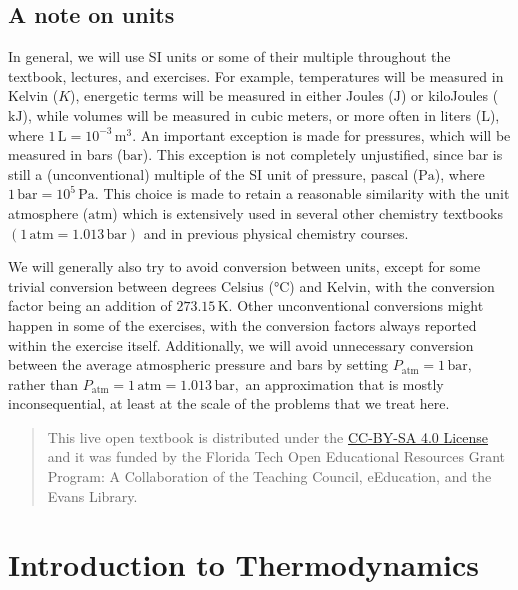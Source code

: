 \documentclass[
  9pt,
]{extbook}
\let\origdoublepage\cleardoublepage
\newcommand{\clearemptydoublepage}{%
  \clearpage
  {\pagestyle{empty}\origdoublepage}%
}
\let\cleardoublepage\clearemptydoublepage
\theoremstyle{definition}
\theoremstyle{definition}
\theoremstyle{definition}
\theoremstyle{remark}
\begin{document}
\hypertarget{a-note-on-units}{%
\section*{A note on units}\label{a-note-on-units}}

In general, we will use SI units or some of their multiple throughout the textbook, lectures, and exercises. For example, temperatures will be measured in Kelvin (\(K\)), energetic terms will be measured in either Joules (\(\text{J}\)) or kiloJoules (\(\text{kJ}\)), while volumes will be measured in cubic meters, or more often in liters (\(\text{L}\)), where \(1\,\text{L} = 10^{-3}\,\text{m}^3\). An important exception is made for pressures, which will be measured in bars (\(\text{bar}\)). This exception is not completely unjustified, since bar is still a (unconventional) multiple of the SI unit of pressure, pascal (\(\text{Pa}\)), where \(1\,\text{bar} = 10^5\,\text{Pa}\). This choice is made to retain a reasonable similarity with the unit atmosphere (\(\text{atm}\)) which is extensively used in several other chemistry textbooks \((1\,\text{atm} = 1.013\,\text{bar})\) and in previous physical chemistry courses.

We will generally also try to avoid conversion between units, except for some trivial conversion between degrees Celsius (°C) and Kelvin, with the conversion factor being an addition of \(273.15\,\text{K}\). Other unconventional conversions might happen in some of the exercises, with the conversion factors always reported within the exercise itself.
Additionally, we will avoid unnecessary conversion between the average atmospheric pressure and bars by setting \(P_{\text{atm}} = 1\,\text{bar},\) rather than \(P_{\text{atm}} = 1\,\text{atm} = 1.013\, \text{bar},\) an approximation that is mostly inconsequential, at least at the scale of the problems that we treat here.

\begin{quote}
This live open textbook is distributed under the \href{https://creativecommons.org/licenses/by-sa/4.0/}{CC-BY-SA 4.0 License} and it was funded by the Florida Tech Open Educational Resources Grant Program: A Collaboration of the Teaching Council, eEducation, and the Evans Library.
\end{quote}

\cleardoublepage
{}

\hypertarget{SystemVariables}{%
\chapter{Introduction to Thermodynamics}\label{SystemVariables}}
\end{document}
